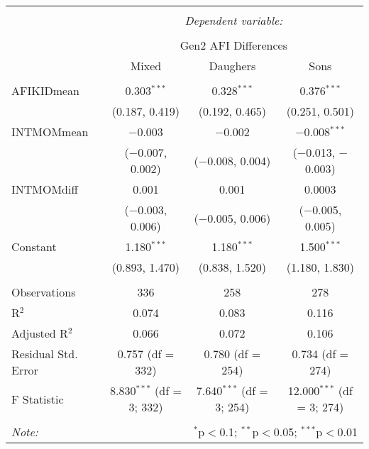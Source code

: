 
\begingroup 
\small 
\begin{tabular}{@{\extracolsep{1pt}}lccc} 
\\[-1.8ex]\hline 
\hline \\[-1.8ex] 
 & \multicolumn{3}{c}{\textit{Dependent variable:}} \\ 
\cline{2-4} 
\\[-1.8ex] & \multicolumn{3}{c}{Gen2 AFI Differences} \\ 
 & Mixed & Daughers & Sons \\ 
\hline \\[-1.8ex] 
 AFIKIDmean & 0.303$^{***}$ & 0.328$^{***}$ & 0.376$^{***}$ \\ 
  & (0.187, 0.419) & (0.192, 0.465) & (0.251, 0.501) \\ 
  INTMOMmean & $-$0.003 & $-$0.002 & $-$0.008$^{***}$ \\ 
  & ($-$0.007, 0.002) & ($-$0.008, 0.004) & ($-$0.013, $-$0.003) \\ 
  INTMOMdiff & 0.001 & 0.001 & 0.0003 \\ 
  & ($-$0.003, 0.006) & ($-$0.005, 0.006) & ($-$0.005, 0.005) \\ 
  Constant & 1.180$^{***}$ & 1.180$^{***}$ & 1.500$^{***}$ \\ 
  & (0.893, 1.470) & (0.838, 1.520) & (1.180, 1.830) \\ 
 \hline \\[-1.8ex] 
Observations & 336 & 258 & 278 \\ 
R$^{2}$ & 0.074 & 0.083 & 0.116 \\ 
Adjusted R$^{2}$ & 0.066 & 0.072 & 0.106 \\ 
Residual Std. Error & 0.757 (df = 332) & 0.780 (df = 254) & 0.734 (df = 274) \\ 
F Statistic & 8.830$^{***}$ (df = 3; 332) & 7.640$^{***}$ (df = 3; 254) & 12.000$^{***}$ (df = 3; 274) \\ 
\hline 
\hline \\[-1.8ex] 
\textit{Note:}  & \multicolumn{3}{r}{$^{*}$p$<$0.1; $^{**}$p$<$0.05; $^{***}$p$<$0.01} \\ 
\end{tabular} 
\endgroup 
